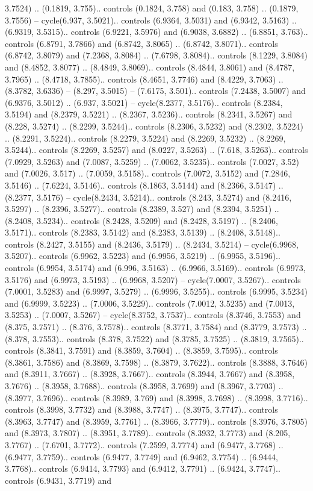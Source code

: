 3.7524) .. (0.1819, 3.755).. controls (0.1824, 3.758) and (0.183, 3.758) .. (0.1879, 3.7556) -- cycle(6.937, 3.5021).. controls (6.9364, 3.5031) and (6.9342, 3.5163) .. (6.9319, 3.5315).. controls (6.9221, 3.5976) and (6.9038, 3.6882) .. (6.8851, 3.763).. controls (6.8791, 3.7866) and (6.8742, 3.8065) .. (6.8742, 3.8071).. controls (6.8742, 3.8079) and (7.2368, 3.8084) .. (7.6798, 3.8084).. controls (8.1229, 3.8084) and (8.4852, 3.8077) .. (8.4849, 3.8069).. controls (8.4844, 3.8061) and (8.4787, 3.7965) .. (8.4718, 3.7855).. controls (8.4651, 3.7746) and (8.4229, 3.7063) .. (8.3782, 3.6336) -- (8.297, 3.5015) -- (7.6175, 3.501).. controls (7.2438, 3.5007) and (6.9376, 3.5012) .. (6.937, 3.5021) -- cycle(8.2377, 3.5176).. controls (8.2384, 3.5194) and (8.2379, 3.5221) .. (8.2367, 3.5236).. controls (8.2341, 3.5267) and (8.228, 3.5274) .. (8.2299, 3.5244).. controls (8.2306, 3.5232) and (8.2302, 3.5224) .. (8.2291, 3.5224).. controls (8.2279, 3.5224) and (8.2269, 3.5232) .. (8.2269, 3.5244).. controls (8.2269, 3.5257) and (8.0227, 3.5263) .. (7.618, 3.5263).. controls (7.0929, 3.5263) and (7.0087, 3.5259) .. (7.0062, 3.5235).. controls (7.0027, 3.52) and (7.0026, 3.517) .. (7.0059, 3.5158).. controls (7.0072, 3.5152) and (7.2846, 3.5146) .. (7.6224, 3.5146).. controls (8.1863, 3.5144) and (8.2366, 3.5147) .. (8.2377, 3.5176) -- cycle(8.2434, 3.5214).. controls (8.243, 3.5274) and (8.2416, 3.5297) .. (8.2396, 3.5277).. controls (8.2389, 3.527) and (8.2394, 3.5251) .. (8.2408, 3.5234).. controls (8.2428, 3.5209) and (8.2428, 3.5197) .. (8.2406, 3.5171).. controls (8.2383, 3.5142) and (8.2383, 3.5139) .. (8.2408, 3.5148).. controls (8.2427, 3.5155) and (8.2436, 3.5179) .. (8.2434, 3.5214) -- cycle(6.9968, 3.5207).. controls (6.9962, 3.5223) and (6.9956, 3.5219) .. (6.9955, 3.5196).. controls (6.9954, 3.5174) and (6.996, 3.5163) .. (6.9966, 3.5169).. controls (6.9973, 3.5176) and (6.9973, 3.5193) .. (6.9968, 3.5207) -- cycle(7.0007, 3.5267).. controls (7.0001, 3.5283) and (6.9997, 3.5279) .. (6.9996, 3.5255).. controls (6.9995, 3.5234) and (6.9999, 3.5223) .. (7.0006, 3.5229).. controls (7.0012, 3.5235) and (7.0013, 3.5253) .. (7.0007, 3.5267) -- cycle(8.3752, 3.7537).. controls (8.3746, 3.7553) and (8.375, 3.7571) .. (8.376, 3.7578).. controls (8.3771, 3.7584) and (8.3779, 3.7573) .. (8.378, 3.7553).. controls (8.378, 3.7522) and (8.3785, 3.7525) .. (8.3819, 3.7565).. controls (8.3841, 3.7591) and (8.3859, 3.7604) .. (8.3859, 3.7595).. controls (8.3861, 3.7586) and (8.3869, 3.7598) .. (8.3879, 3.7622).. controls (8.3888, 3.7646) and (8.3911, 3.7667) .. (8.3928, 3.7667).. controls (8.3944, 3.7667) and (8.3958, 3.7676) .. (8.3958, 3.7688).. controls (8.3958, 3.7699) and (8.3967, 3.7703) .. (8.3977, 3.7696).. controls (8.3989, 3.769) and (8.3998, 3.7698) .. (8.3998, 3.7716).. controls (8.3998, 3.7732) and (8.3988, 3.7747) .. (8.3975, 3.7747).. controls (8.3963, 3.7747) and (8.3959, 3.7761) .. (8.3966, 3.7779).. controls (8.3976, 3.7805) and (8.3973, 3.7807) .. (8.3951, 3.7789).. controls (8.3932, 3.7773) and (8.205, 3.7767) .. (7.6701, 3.7772).. controls (7.2599, 3.7774) and (6.9477, 3.7768) .. (6.9477, 3.7759).. controls (6.9477, 3.7749) and (6.9462, 3.7754) .. (6.9444, 3.7768).. controls (6.9414, 3.7793) and (6.9412, 3.7791) .. (6.9424, 3.7747).. controls (6.9431, 3.7719) and 